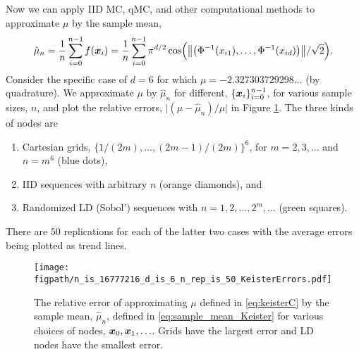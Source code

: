 \documentclass{svproc}
\newcommand{\figpath}{Figures}
\begin{document}
Now we can apply IID MC, qMC, and other computational methods to approximate $\mu$ by the sample mean,
\begin{equation} \label{eq:sample_mean_Keister}
	\hat{\mu}_n = \frac 1n \sum_{i=0}^{n-1} f ({\boldsymbol{x}}_i) = \frac 1n \sum_{i=0}^{n-1} \pi^{d/2} \cos\Bigl (\bigl \lVert \bigl( \Phi^{-1}(x_{i1}), \ldots, \Phi^{-1}(x_{id})\bigr) \bigr\rVert/\sqrt{2}  \Bigr).
\end{equation}
Consider the specific case of $d=6$ for which $\mu = -2.327303729298\ldots$ (by quadrature).  We approximate $\mu$ by $\hat{\mu}_n$ for different, $\{{\boldsymbol{x}}_i\}_{i=0}^{n-1}$, for various sample sizes, $n$, and plot the relative errors, $\lvert (\mu - 	\hat{\mu}_n)/\mu\rvert$ in Figure \ref{fig:keister-err}. The three kinds of nodes are
\begin{enumerate}
	\renewcommand{\labelenumi}{\roman{enumi}.}
	\item Cartesian grids, $\{1/(2m), \ldots, (2m-1)/(2m) \}^6$, for $m = 2, 3, \ldots$ and $n = m^6$ (blue dots),
	\item IID sequences with arbitrary $n$ (orange diamonds), and
	\item Randomized LD (Sobol') sequences with $n = 1, 2, \ldots, 2^m, \ldots $ (green squares).
\end{enumerate}
There are $50$ replications for each of the latter two cases with the average errors being plotted as trend lines.

\begin{figure}
	\centering
	\texttt{[image: \\figpath/n\_is\_16777216\_d\_is\_6\_n\_rep\_is\_50\_KeisterErrors.pdf]}
	\caption{The relative error of approximating $\mu$ defined in \eqref{eq:keisterC} by the sample mean, $\hat{\mu}_n$, defined in \eqref{eq:sample_mean_Keister} for various choices of nodes, ${\boldsymbol{x}}_0, {\boldsymbol{x}}_1, \ldots$.  Grids have the largest error and LD nodes have the smallest error. \label{fig:keister-err}}
\end{figure}
\end{document}
